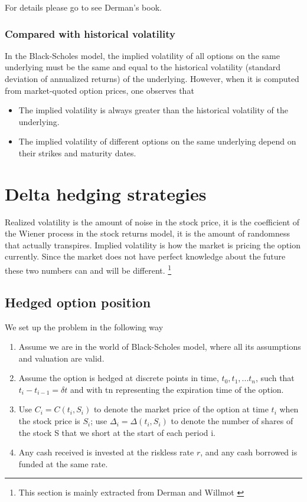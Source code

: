 \documentclass[10pt]{article}
\theoremstyle{plain}
\numberwithin{equation}{section}
\numberwithin{table}{section}
\newcommand{\de}{\delta}
\begin{document}
For details please go to see Derman's book\cite{Derman}.



\subsubsection{Compared with historical volatility}
In the Black-Scholes model, the implied volatility of all options on the same
underlying must be the same and equal to the historical volatility (standard
deviation of annualized returns) of the underlying. However, when it is computed
from market-quoted option prices, one observes that
\begin{itemize}
    \item The implied volatility is always greater than the historical volatility of the
    underlying.
    \item The implied volatility of different options on the same underlying depend
    on their strikes and maturity dates.
\end{itemize}


\newpage 
\section{Delta hedging strategies}
Realized volatility is the amount of noise in the stock price, it is the coefficient
of the Wiener process in the stock returns model, it is the amount of randomness that actually transpires. Implied volatility is how the
market is pricing the option currently. Since the market does not have
perfect knowledge about the future these two numbers can and will be
different. \footnote{This section is mainly extracted from Derman \cite{Derman} and Willmot \cite{Wilmott}}

\subsection{Hedged option position}

We set up the problem in the following way
\begin{enumerate}
    \item Assume we are in the world of Black-Scholes model, where all its assumptions and valuation are valid.
    \item Assume the option
    is hedged at discrete points in time, $t_0, t_1,...t_n$, such that $t_i-t_{i-1}=\de t$ and
    with tn representing the expiration time of the option.
    \item Use $C_i = C(t_i, S_i)$ to denote the market price of the option at time $t_i$ when the
    stock price is $S_i$; use $\Delta_i=\Delta(t_i, S_i)$ to denote the number of shares of
    the stock S that we short at the start of each period i.
    \item Any cash received is
    invested at the riskless rate $r$, and any cash borrowed is funded at the same
    rate.
\end{enumerate}
\end{document}
